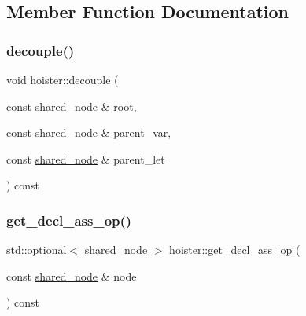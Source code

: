 \subsection{Member Function Documentation}
\mbox{\label{classjawe_1_1hoister_a873d522bfb787607d5d07cbe01ae4344}} 
\subsubsection{\texorpdfstring{decouple()}{decouple()}}
{\footnotesize\ttfamily void hoister\+::decouple (\begin{DoxyParamCaption}\item[{const \hyperlink{namespacejawe_a3f307481d921b6cbb50cc8511fc2b544}{shared\+\_\+node} \&}]{root,  }\item[{const \hyperlink{namespacejawe_a3f307481d921b6cbb50cc8511fc2b544}{shared\+\_\+node} \&}]{parent\+\_\+var,  }\item[{const \hyperlink{namespacejawe_a3f307481d921b6cbb50cc8511fc2b544}{shared\+\_\+node} \&}]{parent\+\_\+let }\end{DoxyParamCaption}) const\hspace{0.3cm}{\ttfamily [private]}}

\mbox{\label{classjawe_1_1hoister_ade816feb01b1c0dc5bd56a5f78cb3947}} 
\subsubsection{\texorpdfstring{get\+\_\+decl\+\_\+ass\+\_\+op()}{get\_decl\_ass\_op()}}
{\footnotesize\ttfamily std\+::optional$<$ \hyperlink{namespacejawe_a3f307481d921b6cbb50cc8511fc2b544}{shared\+\_\+node} $>$ hoister\+::get\+\_\+decl\+\_\+ass\+\_\+op (\begin{DoxyParamCaption}\item[{const \hyperlink{namespacejawe_a3f307481d921b6cbb50cc8511fc2b544}{shared\+\_\+node} \&}]{node }\end{DoxyParamCaption}) const\hspace{0.3cm}{\ttfamily [private]}}

\mbox{\label{classjawe_1_1hoister_a0ded030bc81ae44432c35d5cdc457f6b}} 
